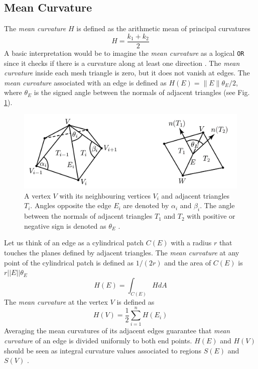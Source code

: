 \subsection{Mean Curvature}
The \textit{mean curvature} $H$ is defined as the arithmetic mean of principal curvatures $$H = \frac{k_1 + k_2}{2}$$  A basic interpretation would be to imagine the \textit{mean curvature} as a logical \texttt{OR} since it checks if there is a curvature along at least one direction \cite{WEBSITE:gaussiancurvaturedirty}.
The \textit{mean curvature} inside each mesh triangle is zero, but it does not vanish at edges. The \textit{mean curvature} associated with an edge is defined as $H(E) = \parallel E \parallel {\theta}_E/2$, where ${\theta}_E$ is the signed
angle between the normals of adjacent triangles (see Fig. \ref{fig:mean-curvature}).

\begin{figure}[!h]
  \centering
\includegraphics[width=11.5cm]{images/mean_curvature_paper.png}
\caption{A vertex $V$ with its neighbouring vertices $V_i$ and adjacent triangles $T_i$. Angles opposite the edge $E_i$ are denoted by $\alpha_i$ and $\beta_i$. The
angle between the normals of adjacent triangles $T_1$ and $T_2$ with positive or negative sign is denoted as ${\theta}_E$ \cite{geometryprocessing}.}\label{fig:mean-curvature}
\end{figure}
Let us think of an edge as a cylindrical patch $C(E)$ with a radius $r$ that touches the planes defined by adjacent triangles. The \textit{mean curvature} at any point of the cylindrical patch is defined as $1/(2r)$ and the area of $C(E)$ is $r||E||\theta_E$
$$H(E) = \int_{C(E)} HdA$$
The \textit{mean curvature} at the vertex $V$ is defined as $$H(V) = \frac{1}{2} \sum_{i=1}^n H(E_i)$$ Averaging the mean curvatures of its adjacent edges guarantee that \textit{mean curvature} of an edge is divided uniformly to both end points. $H(E)$ and $H(V)$ should be seen as integral curvature values associated to regions $S(E)$ and $S(V)$ \cite{geometryprocessing}.


